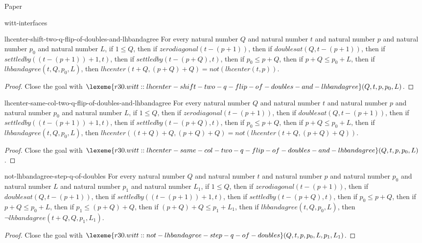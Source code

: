 \begin{lexlean}{Paper}
\begin{section}{witt-interfaces}
  \begin{theorem}{lhcenter-shift-two-q-flip-of-doubles-and-lhbandagree}
  For every natural number \(Q\) and natural number \(t\) and natural number \(p\) and natural number \(p_0\) and natural number \(L\), if \(1 ≤ Q\), then if \(zerodiagonal(t - (p + 1))\), then if \(doublesat(Q, t - (p + 1))\), then if \(settledby((t - (p + 1)) + 1, t)\), then if \(settledby(t - (p + Q), t)\), then if \(p_0 ≤ p + Q\), then if \(p + Q ≤ p_0 + L\), then if \(lhbandagree(t, Q, p_0, L)\), then \(lhcenter(t + Q, (p + Q) + Q) = not(lhcenter(t, p))\).
  \begin{proof}
  Close the goal with \(\lexeme{r30.witt::lhcenter-shift-two-q-flip-of-doubles-and-lhbandagree}(Q, t, p, p_0, L)\).
  \end{proof}
  \end{theorem}

  \begin{theorem}{lhcenter-same-col-two-q-flip-of-doubles-and-lhbandagree}
  For every natural number \(Q\) and natural number \(t\) and natural number \(p\) and natural number \(p_0\) and natural number \(L\), if \(1 ≤ Q\), then if \(zerodiagonal(t - (p + 1))\), then if \(doublesat(Q, t - (p + 1))\), then if \(settledby((t - (p + 1)) + 1, t)\), then if \(settledby(t - (p + Q), t)\), then if \(p_0 ≤ p + Q\), then if \(p + Q ≤ p_0 + L\), then if \(lhbandagree(t, Q, p_0, L)\), then \(lhcenter((t + Q) + Q, (p + Q) + Q) = not(lhcenter(t + Q, (p + Q) + Q))\).
  \begin{proof}
  Close the goal with \(\lexeme{r30.witt::lhcenter-same-col-two-q-flip-of-doubles-and-lhbandagree}(Q, t, p, p_0, L)\).
  \end{proof}
  \end{theorem}

  \begin{theorem}{not-lhbandagree-step-q-of-doubles}
  For every natural number \(Q\) and natural number \(t\) and natural number \(p\) and natural number \(p_0\) and natural number \(L\) and natural number \(p_1\) and natural number \(L_1\), if \(1 ≤ Q\), then if \(zerodiagonal(t - (p + 1))\), then if \(doublesat(Q, t - (p + 1))\), then if \(settledby((t - (p + 1)) + 1, t)\), then if \(settledby(t - (p + Q), t)\), then if \(p_0 ≤ p + Q\), then if \(p + Q ≤ p_0 + L\), then if \(p_1 ≤ (p + Q) + Q\), then if \((p + Q) + Q ≤ p_1 + L_1\), then if \(lhbandagree(t, Q, p_0, L)\), then \(¬lhbandagree(t + Q, Q, p_1, L_1)\).
  \begin{proof}
  Close the goal with \(\lexeme{r30.witt::not-lhbandagree-step-q-of-doubles}(Q, t, p, p_0, L, p_1, L_1)\).
  \end{proof}
  \end{theorem}


\end{section}
\end{lexlean}
